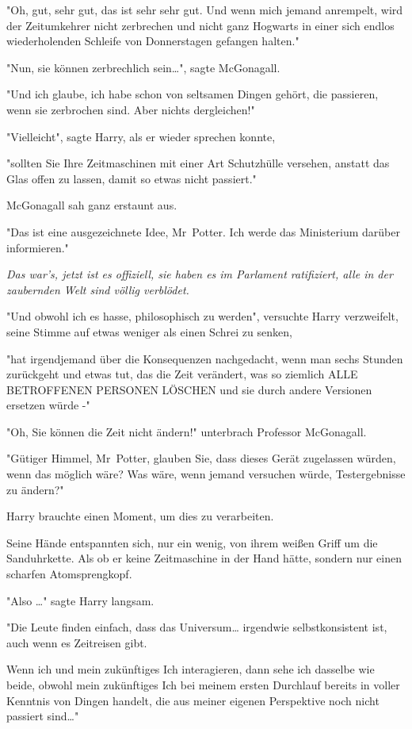 {"Oh, gut, sehr gut, das ist sehr sehr gut. Und wenn mich jemand anrempelt, wird der Zeitumkehrer nicht zerbrechen und nicht ganz Hogwarts in einer sich endlos wiederholenden Schleife von Donnerstagen gefangen halten."

"Nun, sie können zerbrechlich sein…", sagte McGonagall.

"Und ich glaube, ich habe schon von seltsamen Dingen gehört, die passieren, wenn sie zerbrochen sind. Aber nichts dergleichen!"

"Vielleicht", sagte Harry, als er wieder sprechen konnte,

"sollten Sie Ihre Zeitmaschinen mit einer Art Schutzhülle versehen, anstatt das Glas offen zu lassen, damit so etwas nicht passiert."

McGonagall sah ganz erstaunt aus.

"Das ist eine ausgezeichnete Idee, Mr~Potter. Ich werde das Ministerium darüber informieren."

\emph{Das war's, jetzt ist es offiziell, sie haben es im Parlament ratifiziert, alle in der zaubernden Welt sind völlig verblödet.}

"Und obwohl ich es hasse, philosophisch zu werden", versuchte Harry verzweifelt, seine Stimme auf etwas weniger als einen Schrei zu senken,

"hat irgendjemand über die Konsequenzen nachgedacht, wenn man sechs Stunden zurückgeht und etwas tut, das die Zeit verändert, was so ziemlich ALLE BETROFFENEN PERSONEN LÖSCHEN und sie durch andere Versionen ersetzen würde -"

"Oh, Sie können die Zeit nicht ändern!" unterbrach Professor McGonagall.

"Gütiger Himmel, Mr~Potter, glauben Sie, dass dieses Gerät zugelassen würden, wenn das möglich wäre? Was wäre, wenn jemand versuchen würde, Testergebnisse zu ändern?"

Harry brauchte einen Moment, um dies zu verarbeiten.

Seine Hände entspannten sich, nur ein wenig, von ihrem weißen Griff um die Sanduhrkette. Als ob er keine Zeitmaschine in der Hand hätte, sondern nur einen scharfen Atomsprengkopf.

"Also …" sagte Harry langsam.

"Die Leute finden einfach, dass das Universum… irgendwie selbstkonsistent ist, auch wenn es Zeitreisen gibt.

Wenn ich und mein zukünftiges Ich interagieren, dann sehe ich dasselbe wie beide, obwohl mein zukünftiges Ich bei meinem ersten Durchlauf bereits in voller Kenntnis von Dingen handelt, die aus meiner eigenen Perspektive noch nicht passiert sind…"

}
